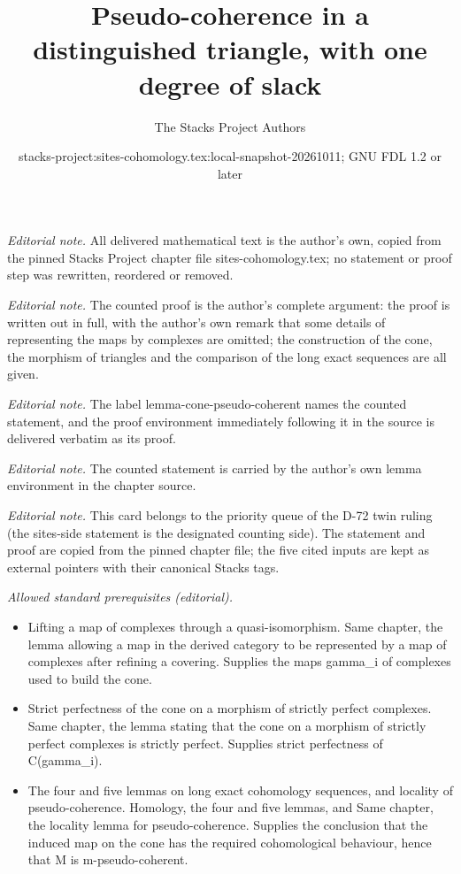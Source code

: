 \documentclass[10pt,a4paper]{amsart}
\title{Pseudo-coherence in a distinguished triangle, with one degree of slack}
\author{The Stacks Project Authors}
\date{stacks-project:sites-cohomology.tex:local-snapshot-20261011; GNU FDL 1.2 or later}
\theoremstyle{plain}
\theoremstyle{definition}
\theoremstyle{remark}
\numberwithin{equation}{subsection}
\begin{document}
\maketitle
\noindent\textit{Editorial note.} All delivered mathematical text is the author's own, copied from the pinned Stacks Project chapter file sites-cohomology.tex; no statement or proof step was rewritten, reordered or removed.\par\medskip
\noindent\textit{Editorial note.} The counted proof is the author's complete argument: the proof is written out in full, with the author's own remark that some details of representing the maps by complexes are omitted; the construction of the cone, the morphism of triangles and the comparison of the long exact sequences are all given.\par\medskip
\noindent\textit{Editorial note.} The label lemma-cone-pseudo-coherent names the counted statement, and the proof environment immediately following it in the source is delivered verbatim as its proof.\par\medskip
\noindent\textit{Editorial note.} The counted statement is carried by the author's own lemma environment in the chapter source.\par\medskip
\noindent\textit{Editorial note.} This card belongs to the priority queue of the D-72 twin ruling (the sites-side statement is the designated counting side). The statement and proof are copied from the pinned chapter file; the five cited inputs are kept as external pointers with their canonical Stacks tags.\par\medskip
\noindent\textit{Allowed standard prerequisites (editorial).}\begin{itemize}
\item Lifting a map of complexes through a quasi-isomorphism. Same chapter, the lemma allowing a map in the derived category to be represented by a map of complexes after refining a covering. Supplies the maps gamma\_i of complexes used to build the cone.
\item Strict perfectness of the cone on a morphism of strictly perfect complexes. Same chapter, the lemma stating that the cone on a morphism of strictly perfect complexes is strictly perfect. Supplies strict perfectness of C(gamma\_i).
\item The four and five lemmas on long exact cohomology sequences, and locality of pseudo-coherence. Homology, the four and five lemmas, and Same chapter, the locality lemma for pseudo-coherence. Supplies the conclusion that the induced map on the cone has the required cohomological behaviour, hence that M is m-pseudo-coherent.
\end{itemize}\medskip
\end{document}
